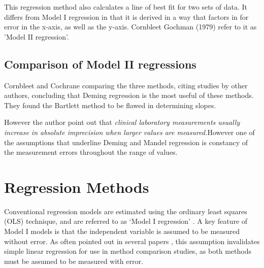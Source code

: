 \documentclass[12pt, a4paper]{report}
\theoremstyle{plain}
\theoremstyle{definition}
\theoremstyle{remark}
\begin{document}
This regression method also calculates a line of best fit for two sets of data. It differs from Model I regression in that it is derived in a way that factors in for error in the x-axis, as well as the y-axis. Cornbleet Gochman (1979) refer to it as 'Model II regression'.

\subsection{Comparison of Model II regressions}
Cornbleet and Cochrane comparing the three methods, citing studies by other authors, concluding that Deming regression is the most useful of these methods. They found the Bartlett method to be
flawed in determining slopes.

However the author point out that \emph{ clinical laboratory measurements usually increase in absolute imprecision when larger values are measured.}However one of the assumptions that underline Deming and Mandel regression is constancy of the measurement errors throughout the range of values.






\section{Regression Methods}
	Conventional regression models are estimated using the ordinary
	least squares (OLS) technique, and are referred to as `Model I
	regression' \citep{CornCoch,ludbrook97}. A key feature of Model I
	models is that the independent variable is assumed to be measured
	without error. As often pointed out in several papers
	\citep{BA83,ludbrook97}, this assumption invalidates simple linear
	regression for use in method comparison studies, as both methods
	must be assumed to be measured with error.
	
\end{document}
